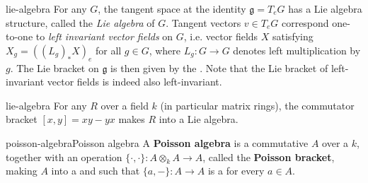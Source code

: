 \begin{example}{lie-algebra}
    For any  $G$, the tangent space at the identity $\mathfrak{g} = T_e G$ has a Lie algebra structure, called the \textit{Lie algebra} of $G$. Tangent vectors $v \in T_e G$ correspond one-to-one to \textit{left invariant vector fields} on $G$, i.e. vector fields $X$ satisfying $X_g = ((L_g)_* X)_e$ for all $g \in G$, where $L_g : G \to G$ denotes left multiplication by $g$. The Lie bracket on $\mathfrak{g}$ is then given by the . Note that the Lie bracket of left-invariant vector fields is indeed also left-invariant.
\end{example}

\begin{example}{lie-algebra}
    For any  $R$ over a field $k$ (in particular matrix rings), the commutator bracket $[x, y] = xy - yx$ makes $R$ into a Lie algebra.
\end{example}

\begin{topic}{poisson-algebra}{Poisson algebra}
    A \textbf{Poisson algebra} is a commutative  $A$ over a  $k$, together with an operation $\{ \cdot, \cdot \} : A \otimes_k A \to A$, called the \textbf{Poisson bracket}, making $A$ into a  and such that $\{ a, - \} : A \to A$ is a  for every $a \in A$.
\end{topic}

